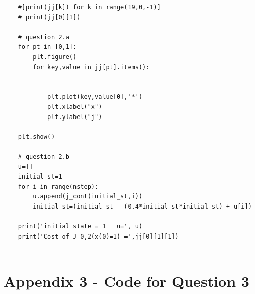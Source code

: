 \documentclass[12pt]{article}
\begin{document}
\begin{lstlisting}
    #[print(jj[k]) for k in range(19,0,-1)]
    # print(jj[0][1])

    # question 2.a
    for pt in [0,1]:
        plt.figure()
        for key,value in jj[pt].items():


            plt.plot(key,value[0],'*')
            plt.xlabel("x")
            plt.ylabel("j")

    plt.show()

    # question 2.b
    u=[]
    initial_st=1
    for i in range(nstep):
        u.append(j_cont(initial_st,i))
        initial_st=(initial_st - (0.4*initial_st*initial_st) + u[i])

    print('initial state = 1   u=', u)
    print('Cost of J 0,2(x(0)=1) =',jj[0][1][1])


\end{lstlisting}


\section{Appendix 3 - Code for Question 3}
\end{document}
